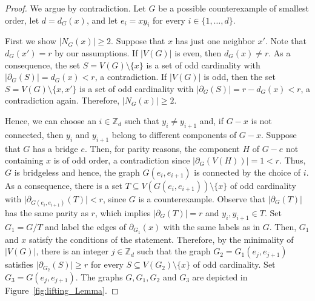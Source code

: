 \documentclass[a4paper,11pt]{article}
\theoremstyle{remark}
\begin{document}
\begin{proof} We argue by contradiction. Let $G$ be a possible counterexample of smallest order, let $d=d_{G}(x)$, and let $e_i=xy_i$ for every $i \in \{1,\ldots, d\}$.
	
	First we show $\vert N_{G}(x) \vert \geq 2$. Suppose that $x$ has just one neighbor $x'$. Note that $d_{G}(x')=r$ by our assumptions. If $\vert V(G) \vert$ is even, then $d_{G}(x) \neq r$. As a consequence, the set $S=V(G) \setminus \{x\}$ is a set of odd cardinality with $\vert \partial_{G}(S) \vert = d_{G}(x) <r$, a contradiction. If $\vert V(G) \vert$ is odd, then the set $S=V(G) \setminus \{x, x'\}$ is a set of odd cardinality with $\vert \partial_{G}(S) \vert = r - d_{G}(x)<r$, a contradiction again. Therefore, $\vert N_{G}(x) \vert \geq 2$.
	
	Hence, we can choose an $i \in \mathbb{Z}_d$ such that $y_i \neq y_{i+1}$ and, if $G-x$ is not connected, then $y_i$ and $y_{i+1}$ belong to different components of $G-x$. Suppose that $G$ has a bridge $e$. Then, for parity reasons, the component $H$ of $G-e$ not containing $x$ is of odd order, a contradiction since $|\partial_{G}(V(H))| =1< r$. Thus, $G$ is bridgeless and hence, the graph $G(e_i,e_{i+1})$ is connected by the choice of $i$. As a consequence, there is a set $T \subseteq V(G(e_i,e_{i+1}))\setminus \{x\}$ of odd cardinality with $\vert \partial_{G(e_i,e_{i+1})}(T)\vert <r$, since $G$ is a counterexample. Observe that $ \vert \partial_{G}(T) \vert$ has the same parity as $ r $, which implies $\vert \partial_{G}(T) \vert =r$ and $y_i,y_{i+1} \in T$. Set $G_1=G/T$ and label the edges of $\partial_{G_1}(x)$ with the same labels as in $G$. Then, $G_1$ and $x$ satisfy the conditions of the statement. Therefore, by the minimality of $\vert V(G) \vert$, there is an integer $j \in \mathbb{Z}_d$ such that the graph $G_2=G_1(e_j,e_{j+1})$ satisfies $\vert \partial_{G_2}(S) \vert \geq r$ for every $S\subseteq V(G_2)\setminus\{x\}$ of odd cardinality. Set $G_3=G(e_j,e_{j+1})$. The graphs $G, G_1, G_2$ and $G_3$ are depicted in Figure~\ref{fig:lifting_Lemma}.


\end{proof}
\end{document}
